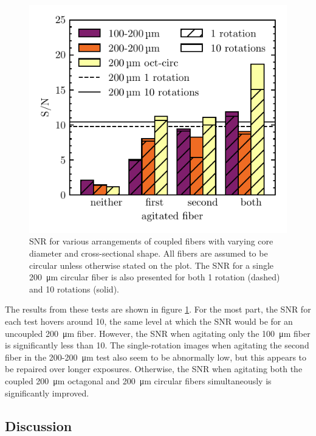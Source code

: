 \documentclass[twocolumn]{emulateapj}
\begin{document}
\begin{figure}
\centering
	\includegraphics[width=\columnwidth]{images/coupled_fibers.pdf}
	\caption{SNR for various arrangements of coupled fibers with varying core diameter and cross-sectional shape. All fibers are assumed to be circular unless otherwise stated on the plot. The SNR for a single \SI{200}{\micro\meter} circular fiber is also presented for both 1 rotation (dashed) and 10 rotations (solid).}
\label{fig:coupled_fibers}
\end{figure}

The results from these tests are shown in figure \ref{fig:coupled_fibers}. For the most part, the SNR for each test hovers around 10, the same level at which the SNR would be for an uncoupled \SI{200}{\micro\meter} fiber. However, the SNR when agitating only the \SI{100}{\micro\meter} fiber is significantly less than 10. The single-rotation images when agitating the second fiber in the 200-\SI{200}{\micro\meter} test also seem to be abnormally low, but this appears to be repaired over longer exposures. Otherwise, the SNR when agitating both the coupled \SI{200}{\micro\meter} octagonal and \SI{200}{\micro\meter} circular fibers simultaneously is significantly improved.

\subsection{Discussion}
\label{subsec:discussion}
\end{document}
